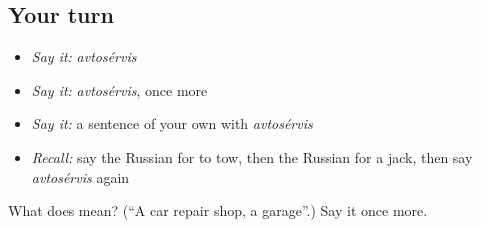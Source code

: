 \subsection*{Your turn}
\begin{itemize}
\raggedright
  \item \emph{Say it:} \emph{avtosérvis}
  \item \emph{Say it:} \emph{avtosérvis}, once more
  \item \emph{Say it:} a sentence of your own with \emph{avtosérvis}
  \item \emph{Recall:} say the Russian for to tow, then the Russian for a jack, then say \emph{avtosérvis} again
\end{itemize}

\begin{tcolorbox}[breakable,colback=teal!4,colframe=teal!35!black,title={Before you move on}]
What does  mean? (\textquotedblleft{}A car repair shop, a garage\textquotedblright{}.) Say it once more.
\end{tcolorbox}
